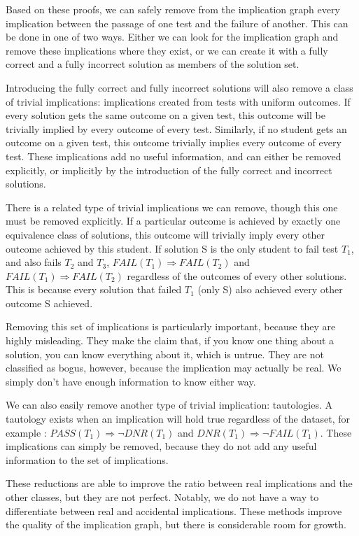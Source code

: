 \documentclass[11pt,twoside]{article}
\newcommand\dnr{\mathit{DNR}}
\newcommand\fail{\mathit{FAIL}}
\newcommand\pass{\mathit{PASS}}
\begin{document}
Based on these proofs, we can safely remove from the implication graph every implication between the passage of one test and the failure of another. This can be done in one of two ways. Either we can look for the implication graph and remove these implications where they exist, or we can create it with a fully correct and a fully incorrect solution as members of the solution set.

Introducing the fully correct and fully incorrect solutions will also remove a class of trivial implications: implications created from tests with uniform outcomes. If every solution gets the same outcome on a given test, this outcome will be trivially implied by every outcome of every test. Similarly, if no student gets an outcome on a given test, this outcome trivially implies every outcome of every test. These implications add no useful information, and can either be removed explicitly, or implicitly by the introduction of the fully correct and incorrect solutions.

There is a related type of trivial implications we can remove, though this one must be removed explicitly. If a particular outcome is achieved by exactly one equivalence class of solutions, this outcome will trivially imply every other outcome achieved by this student. If solution S is the only student to fail test $T_1$, and also fails $T_2$ and $T_3$, $\fail(T_1) \Rightarrow \fail(T_2)$ and $\fail(T_1) \Rightarrow \fail(T_2)$ regardless of the outcomes of every other solutions. This is because every solution that failed $T_1$ (only S) also achieved every other outcome S achieved. 

Removing this set of implications is particularly important, because they are highly misleading. They make the claim that, if you know one thing about a solution, you can know everything about it, which is untrue. They are not classified as bogus, however, because the implication may actually be real. We simply don't have enough information to know either way.

We can also easily remove another type of trivial implication: tautologies. A tautology exists when an implication will hold true regardless of the dataset, for example : $\pass(T_1) \Rightarrow \neg\dnr(T_1)$ and $\dnr(T_1) \Rightarrow \neg\fail(T_1)$. These implications can simply be removed, because they do not add any useful information to the set of implications.

These reductions are able to improve the ratio between real implications and the other classes, but they are not perfect. Notably, we do not have a way to differentiate between real and accidental implications. These methods improve the quality of the implication graph, but there is considerable room for growth.
\end{document}
